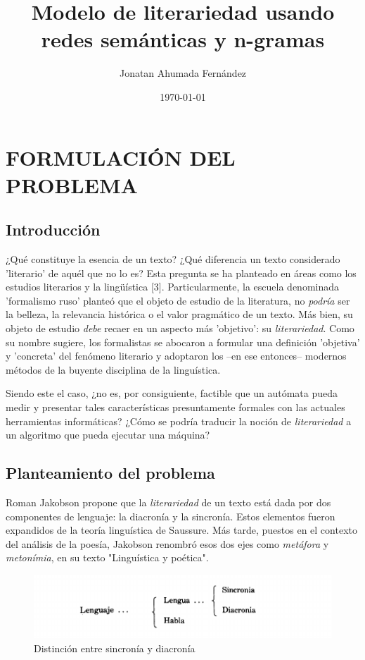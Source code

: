 \documentclass[twoside]{article}
\author{Jonatan Ahumada Fernández}
\date{\today}
\title{Modelo de literariedad usando redes semánticas y n-gramas}
\begin{document}
\maketitle
\tableofcontents

\section{FORMULACIÓN DEL PROBLEMA}
\label{sec:orgb220d16}
\subsection{Introducción}
\label{sec:org0a4f662}

¿Qué constituye la esencia de un texto? ¿Qué diferencia un texto
considerado 'literario' de aquél que no lo es? Esta pregunta se ha
planteado en áreas como los estudios literarios y la lingüística
[3]. Particularmente, la escuela denominada 'formalismo ruso' planteó
que el objeto de estudio de la literatura, no \emph{podría} ser la belleza, la
relevancia histórica o el valor pragmático de un texto. Más
bien, su objeto de estudio \emph{debe} recaer en un aspecto más 'objetivo':
su \emph{literariedad}.  Como su nombre sugiere, los formalistas se
abocaron a formular una definición 'objetiva' y 'concreta' del
fenómeno literario y adoptaron los --en ese entonces-- modernos
métodos de la buyente disciplina de la linguística.

Siendo este el caso, ¿no es, por consiguiente, factible que un
autómata pueda medir y presentar tales características presuntamente
formales con las actuales herramientas informáticas? ¿Cómo se podría
traducir la noción de \emph{literariedad} a un algoritmo que pueda ejecutar
una máquina?


\subsection{Planteamiento del problema}
\label{sec:orgb29bf10}
Roman Jakobson propone que la \emph{literariedad} de un texto está dada por
dos componentes de lenguaje: la diacronía y la sincronía. Estos
elementos fueron expandidos de la teoría linguística de Saussure.
Más tarde, puestos en el contexto del análisis de la poesía,
Jakobson renombró esos dos ejes como \emph{metáfora} y \emph{metonímia}, en su texto
"Linguística y poética". 



\begin{figure}[htbp]
\centering
\includegraphics[width=.9\linewidth]{./assets/clasificacion_saussure.png}
\caption{Distinción entre sincronía y diacronía}
\end{figure}
\end{document}
